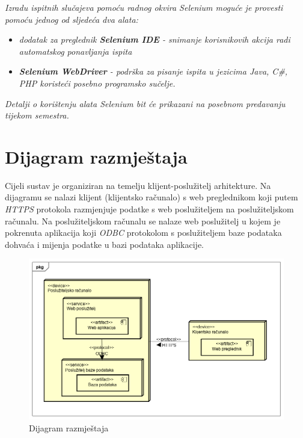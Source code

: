 			 \textit{Izradu ispitnih slučajeva pomoću radnog okvira Selenium moguće je provesti pomoću jednog od sljedeća dva alata:}
			 \begin{itemize}
			 	\item \textit{dodatak za preglednik \textbf{Selenium IDE} - snimanje korisnikovih akcija radi automatskog ponavljanja ispita	}
			 	\item \textit{\textbf{Selenium WebDriver} - podrška za pisanje ispita u jezicima Java, C\#, PHP koristeći posebno programsko sučelje.}
			 \end{itemize}
		 	\textit{Detalji o korištenju alata Selenium bit će prikazani na posebnom predavanju tijekom semestra.}
			
			\eject 
		
		
		\section{Dijagram razmještaja}
%			
%			
	
	
		Cijeli sustav je organiziran na temelju klijent-poslužitelj arhitekture. Na dijagramu se nalazi klijent (klijentsko računalo) s web preglednikom koji putem \textit{HTTPS} protokola razmjenjuje podatke s web poslužiteljem na poslužiteljskom računalu. Na poslužiteljskom računalu se nalaze web poslužitelj u kojem je pokrenuta aplikacija koji \textit{ODBC} protokolom s poslužiteljem baze podataka dohvaća i mijenja podatke u bazi podataka aplikacije.
		
		\begin{figure}[h]
			\centering
			\includegraphics[width=1\linewidth]{dijagrami/deployment_diagram}
			\caption{Dijagram razmještaja}
			\label{fig:deploymentdiagram}
		\end{figure}
			
